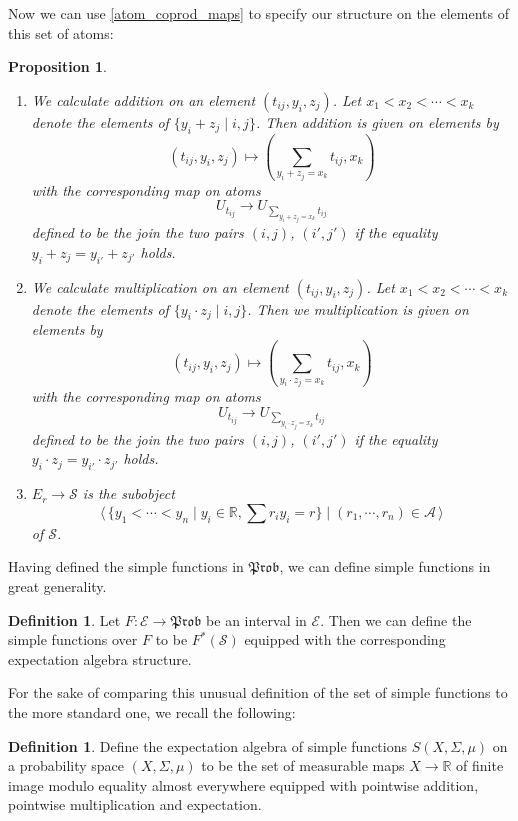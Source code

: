 \documentclass[a4paper]{amsproc}
\theoremstyle{plain}
\newtheorem{proposition}[theorem]{Proposition}
\theoremstyle{definition}
\newtheorem{definition}[theorem]{Definition}
\theoremstyle{remark}
\numberwithin{equation}{section}
\newcommand{\Prob}{\mathfrak{Prob}}
\newcommand{\la}{\langle\,}
\newcommand{\ra}{\,\rangle}
\begin{document}
Now we can use \ref{atom_coprod_maps} to specify our structure on the elements of this set of atoms:

\begin{proposition}
    \begin{enumerate}
        \item We calculate addition on an element $(t_{ij}, y_i, z_j)$. Let $x_1 < x_2 < \cdots < x_k$ denote the elements of $\{y_i + z_j \mid i,j \}$. Then addition is given on elements by
        \[
            (t_{ij},y_i,z_j) \mapsto (\sum_{y_i + z_j = x_k} t_{ij}, x_k)
        \]
        with the corresponding map on atoms
        \[
            U_{t_{ij}} \to U_{\sum_{y_i + z_j = x_k} t_{ij}}
        \]
        defined to be the join the two pairs $(i,j)$, $(i',j')$ if the equality $y_i + z_j = y_{i'} + z_{j'}$ holds.
        \item We calculate multiplication on an element $(t_{ij}, y_i, z_j)$. Let $x_1 < x_2 < \cdots < x_k$ denote the elements of $\{y_i \cdot z_j \mid i,j \}$. Then we multiplication is given on elements by
        \[
            (t_{ij},y_i,z_j) \mapsto (\sum_{y_i \cdot z_j = x_k} t_{ij}, x_k)
        \]
        with the corresponding map on atoms
        \[
            U_{t_{ij}} \to U_{\sum_{y_i \cdot z_j = x_k} t_{ij}}
        \]
        defined to be the join the two pairs $(i,j)$, $(i',j')$ if the equality $y_i \cdot z_j = y_{i'} \cdot z_{j'}$ holds.
        \item $E_r \to \mathcal{S}$ is the subobject
        \[
            \la \{y_1 < \cdots < y_n \mid y_i \in \mathbb{R}, \sum r_i y_i = r \} \mid (r_1, \cdots, r_n) \in \mathcal{A} \ra
        \]
        of $\mathcal{S}$.
    \end{enumerate}
\end{proposition}

Having defined the simple functions in $\Prob$, we can define simple functions in great generality.

\begin{definition}
    Let $F: \mathcal{E} \to \Prob$ be an interval in $\mathcal{E}$. Then we can define the simple functions over $F$ to be $F^*(\mathcal{S})$ equipped with the corresponding expectation algebra structure.
\end{definition}

For the sake of comparing this unusual definition of the set of simple functions to the more standard one, we recall the following:

\begin{definition}
    Define the expectation algebra of simple functions $S(X,\Sigma, \mu)$ on a probability space $(X, \Sigma, \mu)$ to be the set of measurable maps $X \to \mathbb{R}$ of finite image modulo equality almost everywhere equipped with pointwise addition, pointwise multiplication and expectation.
\end{definition}
\end{document}
